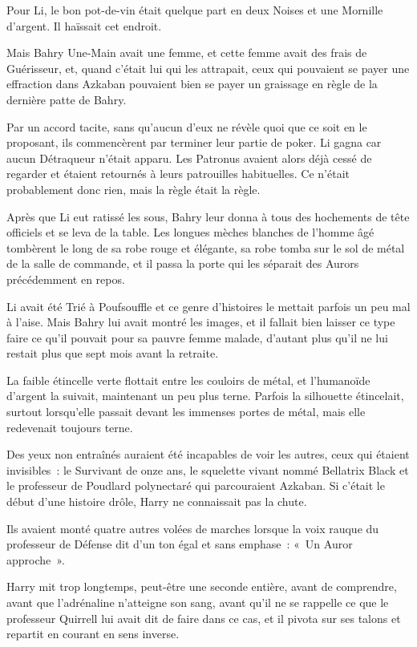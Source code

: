 Pour Li, le bon pot-de-vin était quelque part en deux Noises et une Mornille d'argent.
Il haïssait cet endroit.

Mais Bahry Une-Main avait une femme, et cette femme avait des frais de Guérisseur, et, quand c'était lui qui les attrapait, ceux qui pouvaient se payer une effraction dans Azkaban pouvaient bien se payer un graissage en règle de la dernière patte de Bahry.

Par un accord tacite, sans qu'aucun d'eux ne révèle quoi que ce soit en le proposant, ils commencèrent par terminer leur partie de poker.
Li gagna car aucun Détraqueur n'était apparu.
Les Patronus avaient alors déjà cessé de regarder et étaient retournés à leurs patrouilles habituelles.
Ce n'était probablement donc rien, mais la règle était la règle.

Après que Li eut ratissé les sous, Bahry leur donna à tous des hochements de tête officiels et se leva de la table.
Les longues mèches blanches de l'homme âgé tombèrent le long de sa robe rouge et élégante, sa robe tomba sur le sol de métal de la salle de commande, et il passa la porte qui les séparait des Aurors précédemment en repos.

Li avait été Trié à Poufsouffle et ce genre d'histoires le mettait parfois un peu mal à l'aise.
Mais Bahry lui avait montré les images, et il fallait bien laisser ce type faire ce qu'il pouvait pour sa pauvre femme malade, d'autant plus qu'il ne lui restait plus que sept mois avant la retraite.

\later

La faible étincelle verte flottait entre les couloirs de métal, et l'humanoïde d'argent la suivait, maintenant un peu plus terne.
Parfois la silhouette étincelait, surtout lorsqu'elle passait devant les immenses portes de métal, mais elle redevenait toujours terne.

Des yeux non entraînés auraient été incapables de voir les autres, ceux qui étaient invisibles~: le Survivant de onze ans, le squelette vivant nommé Bellatrix Black et le professeur de Poudlard polynectaré qui parcouraient Azkaban.
Si c'était le début d'une histoire drôle, Harry ne connaissait pas la chute.

Ils avaient monté quatre autres volées de marches lorsque la voix rauque du professeur de Défense dit d'un ton égal et sans emphase~: «~Un Auror approche~».

Harry mit trop longtemps, peut-être une seconde entière, avant de comprendre, avant que l'adrénaline n'atteigne son sang, avant qu'il ne se rappelle ce que le professeur Quirrell lui avait dit de faire dans ce cas, et il pivota sur ses talons et repartit en courant en sens inverse.

